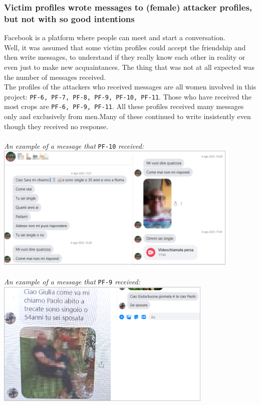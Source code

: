 \subsubsection*{Victim profiles wrote messages to (female) attacker profiles, but not with so good intentions}
Facebook is a platform where people can meet and start a conversation.\\Well, it was assumed that some victim profiles could accept the friendship and then write messages, to understand if they really know each other in reality or even just to make new acquaintances. The thing that was not at all expected was the number of messages received. \\The profiles of the attackers who received messages are all women involved in this project: \texttt{PF-6, PF-7, PF-8, PF-9, PF-10, PF-11}. Those who have received the most crops are \texttt{PF-6, PF-9, PF-11}. All these profiles received many messages only and exclusively from men.Many of these continued to write insistently even though they received no response.\\\\
\quad \textit{An example of a message that }\texttt{PF-10}\textit{ received:}\\
\includegraphics[height=6cm]{immagini/pf-10.png}\\\\
\quad \textit{An example of a message that }\texttt{PF-9}\textit{ received:}\\
\includegraphics[height=6cm]{immagini/pf-9.png}
